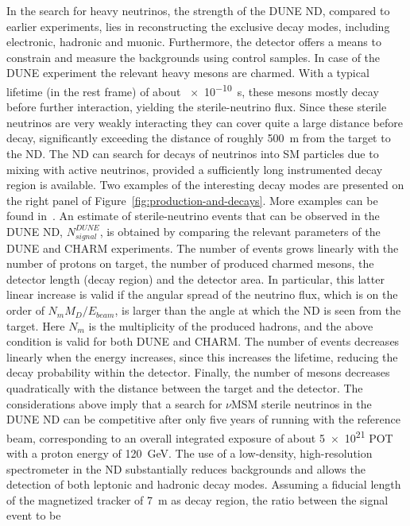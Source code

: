 In the search for heavy
neutrinos, the strength of the DUNE %
ND, compared
to earlier experiments, lies in reconstructing the exclusive decay
modes, including electronic, hadronic and muonic.  Furthermore, the
detector offers a means to constrain and measure the backgrounds using
control samples. 
In case of the DUNE experiment the relevant heavy mesons are charmed. %
With a typical lifetime (in the rest frame) of about
\SI{e-10}{s}, %
these mesons mostly decay before further interaction,
yielding the sterile-neutrino flux.  Since these sterile neutrinos are
very weakly interacting they can cover quite a large distance before
decay, significantly exceeding the distance of roughly \SI{500}{\meter} from the target
to the ND.  The ND can search for decays of neutrinos into SM particles due
to mixing with active neutrinos,
provided a sufficiently long instrumented decay region is available.
Two examples of the interesting decay modes are presented on the right
panel of Figure~\ref{fig:production-and-decays}. More examples can be found
in~\cite{Gorbunov:2007ak}. 
An estimate of sterile-neutrino events that can be observed in the
DUNE ND, $N^{DUNE}_{signal}$, is obtained by comparing the
relevant parameters of the DUNE and CHARM experiments.  The number of
events grows linearly with the number of protons on target, the number
of produced charmed mesons, the detector length (decay region) and the
detector area.  In particular, this latter linear increase   is valid if the
angular spread of the neutrino flux, which is on the order of
$N_mM_D/E_{beam}$, is larger than the angle at which the ND is seen
from the target.  Here $N_m$ is the multiplicity of the produced
hadrons, and the above condition is valid for both DUNE and CHARM. The
number of events %
decreases linearly when the energy increases,
since this increases the lifetime, reducing the decay probability within
the detector.  Finally, the number of mesons decreases quadratically
with the distance between the target and the detector.
The considerations above imply that a search for $\nu$MSM sterile
neutrinos in the DUNE ND can be %
competitive after only five years of running with the reference beam,
corresponding to an overall integrated exposure of about \num{5e21}
POT with a proton energy of \SI{120}{GeV}.  The use of a low-density,
high-resolution spectrometer in the ND substantially reduces
backgrounds and allows the detection of both leptonic and hadronic
decay modes.  Assuming a fiducial length of the magnetized tracker of
\SI{7}{m} as decay region, the ratio between the signal event to be
